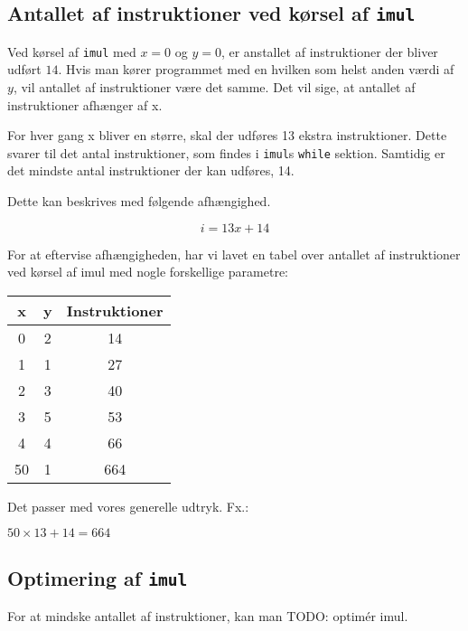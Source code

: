 \documentclass[12pt,a4paper]{article}
\newcommand{\imul}{\texttt{imul}}
\begin{document}
\subsection{Antallet af instruktioner ved kørsel af \imul{}}
Ved kørsel af \imul{} med $x=0$ og $y=0$, er anstallet af instruktioner der bliver udført $14$. Hvis man kører programmet med en hvilken som helst anden værdi af $y$, vil antallet af instruktioner være det samme. Det vil sige, at antallet af instruktioner afhænger af x.

For hver gang x bliver en større, skal der udføres 13 ekstra instruktioner. Dette svarer til det antal instruktioner, som findes i \imul{}s \texttt{while} sektion. Samtidig er det mindste antal instruktioner der kan udføres, 14.

Dette kan beskrives med følgende afhængighed.

\[
	i = 13x + 14
\]

For at eftervise afhængigheden, har vi lavet en tabel over antallet af instruktioner ved kørsel af imul med nogle forskellige parametre:

\begin{tabular}{|c|c|c|}
\hline
x & y & Instruktioner \\ \hline
0 & 2 & 14  \\ \hline
1 & 1 & 27  \\ \hline
2 & 3 & 40  \\ \hline
3 & 5 & 53  \\ \hline
4 & 4 & 66  \\ \hline
50& 1 & 664 \\ \hline

\end{tabular}

Det passer med vores generelle udtryk. Fx.:

$50 \times 13 + 14 = 664$

\subsection{Optimering af \imul{}}

For at mindske antallet af instruktioner, kan man TODO: optimér imul.
\end{document}
